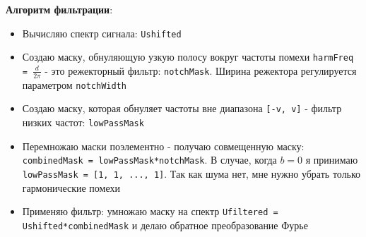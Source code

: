\documentclass[a4paper,12pt]{article}
\begin{document}
\textbf{Алгоритм фильтрации}:
\begin{itemize}
	\item Вычисляю спектр сигнала: \texttt{Ushifted}
	\item Создаю маску, обнуляющую узкую полосу вокруг частоты помехи \texttt{harmFreq = \(\frac{d}{2\pi}\)} - это режекторный фильтр: \texttt{notchMask}. Ширина режектора регулируется параметром \texttt{notchWidth}
	\item Создаю маску, которая обнуляет частоты вне диапазона \texttt{[-v, v]} - фильтр низких частот: \texttt{lowPassMask}
	\item Перемножаю маски поэлементно - получаю совмещенную маску: \texttt{combinedMask = lowPassMask*notchMask}. В случае, когда \(b = 0\) я принимаю \texttt{lowPassMask = [1, 1, ..., 1]}. Так как шума нет, мне нужно убрать только гармонические помехи
	\item Применяю фильтр: умножаю маску на спектр \texttt{Ufiltered = Ushifted*combinedMask} и делаю обратное преобразование Фурье

\end{itemize}
\end{document}

